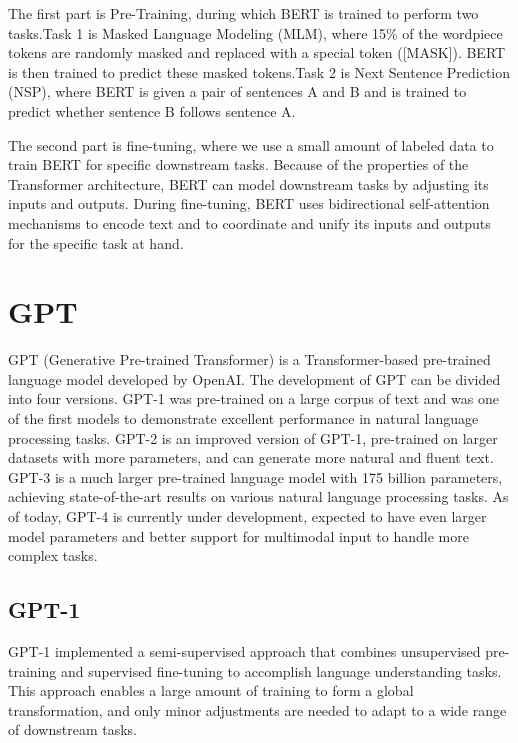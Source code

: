 \documentclass[conference]{IEEEtran}
\begin{document}
\par The first part is Pre-Training, during which BERT 
is trained to perform two tasks.Task 1 is Masked Language Modeling (MLM), where 
15\% of the wordpiece tokens are randomly masked and replaced with a special token ([MASK]). 
BERT is then trained to predict these masked tokens.Task 2 is Next Sentence Prediction (NSP), 
where BERT is given a pair of sentences A and B and is trained to predict whether 
sentence B follows sentence A.

\par The second part is fine-tuning, where we use a small amount of 
labeled data to train BERT for specific downstream tasks. Because of the properties of 
the Transformer architecture, BERT can model downstream tasks by adjusting its inputs and 
outputs. During fine-tuning, BERT uses bidirectional self-attention mechanisms to encode 
text and to coordinate and unify its inputs and outputs for the specific task at hand.

\section{GPT}

\par GPT (Generative Pre-trained Transformer) is a Transformer-based pre-trained language 
model developed by OpenAI. The development of GPT can be divided into four versions. 
GPT-1 was pre-trained on a large corpus of text and was one of the first models to 
demonstrate excellent performance in natural language processing tasks. GPT-2 is an 
improved version of GPT-1, pre-trained on larger datasets with more parameters, and 
can generate more natural and fluent text. GPT-3 is a much larger pre-trained language 
model with 175 billion parameters, achieving state-of-the-art results on various natural 
language processing tasks. As of today, GPT-4 is currently under development, expected 
to have even larger model parameters and better support for multimodal input to handle 
more complex tasks.

\subsection{GPT-1}

\par GPT-1 implemented a semi-supervised approach that combines unsupervised pre-training 
and supervised fine-tuning to accomplish language understanding tasks. This approach 
enables a large amount of training to form a global transformation, and only minor 
adjustments are needed to adapt to a wide range of downstream tasks.
\end{document}
